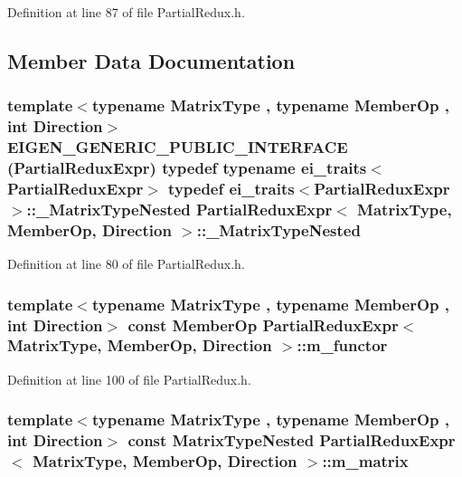 Definition at line 87 of file Partial\-Redux.\-h.



\subsection{Member Data Documentation}
\hypertarget{class_partial_redux_expr_a723596543a966e792a6ee7e7e7256cb7}{
\subsubsection[{\-\_\-\-Matrix\-Type\-Nested}]{\setlength{\rightskip}{0pt plus 5cm}template$<$typename Matrix\-Type , typename Member\-Op , int Direction$>$ E\-I\-G\-E\-N\-\_\-\-G\-E\-N\-E\-R\-I\-C\-\_\-\-P\-U\-B\-L\-I\-C\-\_\-\-I\-N\-T\-E\-R\-F\-A\-C\-E ({\bf Partial\-Redux\-Expr}) typedef typename {\bf ei\-\_\-traits}$<${\bf Partial\-Redux\-Expr}$>$ typedef {\bf ei\-\_\-traits}$<${\bf Partial\-Redux\-Expr}$>$\-::\-\_\-\-Matrix\-Type\-Nested {\bf Partial\-Redux\-Expr}$<$ Matrix\-Type, Member\-Op, Direction $>$\-::\-\_\-\-Matrix\-Type\-Nested}}\label{class_partial_redux_expr_a723596543a966e792a6ee7e7e7256cb7}


Definition at line 80 of file Partial\-Redux.\-h.

\hypertarget{class_partial_redux_expr_a3dfaaa54862c84c1aa2308fc9d8fc03e}{
\subsubsection[{m\-\_\-functor}]{\setlength{\rightskip}{0pt plus 5cm}template$<$typename Matrix\-Type , typename Member\-Op , int Direction$>$ const Member\-Op {\bf Partial\-Redux\-Expr}$<$ Matrix\-Type, Member\-Op, Direction $>$\-::m\-\_\-functor\hspace{0.3cm}{\ttfamily [protected]}}}\label{class_partial_redux_expr_a3dfaaa54862c84c1aa2308fc9d8fc03e}


Definition at line 100 of file Partial\-Redux.\-h.

\hypertarget{class_partial_redux_expr_a2fcdb28629c5ec9a2a6316e4b37e5a9a}{
\subsubsection[{m\-\_\-matrix}]{\setlength{\rightskip}{0pt plus 5cm}template$<$typename Matrix\-Type , typename Member\-Op , int Direction$>$ const Matrix\-Type\-Nested {\bf Partial\-Redux\-Expr}$<$ Matrix\-Type, Member\-Op, Direction $>$\-::m\-\_\-matrix\hspace{0.3cm}{\ttfamily [protected]}}}\label{class_partial_redux_expr_a2fcdb28629c5ec9a2a6316e4b37e5a9a}


